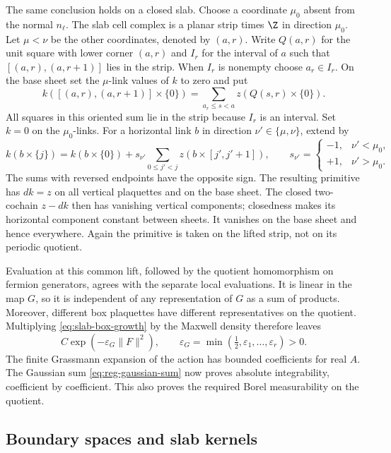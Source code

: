 The same conclusion holds on a closed slab. Choose a coordinate
$\mu_0$ absent from the normal $n_\ell$. The slab cell complex is a
planar strip times $\Z$ in direction $\mu_0$.
Let $\mu<\nu$ be the other coordinates, denoted by $(a,r)$.
Write $Q(a,r)$ for the unit square with lower corner $(a,r)$ and
$I_r$ for the interval of $a$ such that $[(a,r),(a,r+1)]$ lies
in the strip. When $I_r$ is nonempty choose $a_r\in I_r$.
On the base sheet set the $\mu$-link values of $k$ to zero and put
\[
 k([(a,r),(a,r+1)]\times\{0\})
       =\sum_{a_r\le s<a}z(Q(s,r)\times\{0\}).
\]
All squares in this oriented sum lie in the strip because $I_r$
is an interval. Set $k=0$ on the $\mu_0$-links. For a horizontal
link $b$ in direction $\nu'\in\{\mu,\nu\}$, extend by
\[
 k(b\times\{j\})=k(b\times\{0\})
       +s_{\nu'}\sum_{0\le j'<j}z(b\times[j',j'+1]),
 \qquad
 s_{\nu'}=\begin{cases}-1,&\nu'<\mu_0,\\+1,&\nu'>\mu_0.\end{cases}
\]
The sums with reversed endpoints have the opposite sign.
The resulting primitive has $dk=z$ on all vertical
plaquettes and on the base sheet. The closed two-cochain $z-dk$ then
has vanishing vertical components; closedness makes its horizontal
component constant between sheets. It vanishes on the base sheet and
hence everywhere. Again the primitive is taken on the lifted strip,
not on its periodic quotient.

Evaluation at this common lift, followed by the quotient homomorphism
on fermion generators, agrees with the separate local evaluations.
It is linear in the map $G$, so it is independent of any representation
of $G$ as a sum of products. Moreover, different box plaquettes have
different representatives on the quotient. Multiplying
\eqref{eq:slab-box-growth} by the Maxwell density therefore leaves
\begin{equation}\label{eq:slab-local-majorant}
 C\exp(-\varepsilon_G\|F\|^2),\qquad
 \varepsilon_G=\min(\tfrac12,\varepsilon_1,\ldots,\varepsilon_r)>0.
\end{equation}
The finite Grassmann expansion of the action has bounded coefficients
for real $A$. The Gaussian sum \eqref{eq:reg-gaussian-sum} now proves
absolute integrability, coefficient by coefficient. This also proves
the required Borel measurability on the quotient.

\subsection{Boundary spaces and slab kernels}\label{subsec:slab-kernels}


